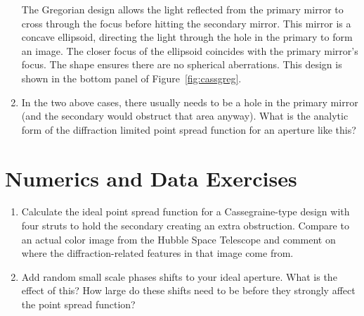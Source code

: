 \begin{enumerate}
\begin{answer}
The Gregorian design allows the light reflected from the primary
mirror to cross through the focus before hitting the secondary
mirror. This mirror is a concave ellipsoid, directing the light
through the hole in the primary to form an image. The closer focus of
the ellipsoid coincides with the primary mirror's focus. The shape
ensures there are no spherical aberrations. This design is shown in
the bottom panel of Figure~\ref{fig:cassgreg}.


\end{answer}

\item In the two above cases, there usually needs to be a hole in the
primary mirror (and the secondary would obstruct that area anyway).
What is the analytic form of the diffraction limited point spread
function for an aperture like this?
\end{enumerate}

\section{Numerics and Data Exercises}

\begin{enumerate}
\item Calculate the ideal point spread function for a Cassegraine-type
design with four struts to hold the secondary creating an extra
obstruction. Compare to an actual color image from the Hubble Space
Telescope and comment on where the diffraction-related features in
that image come from.
\item Add random small scale phases shifts to your ideal
aperture. What is the effect of this? How large do these shifts need
to be before they strongly affect the point spread function?
\end{enumerate}


  
